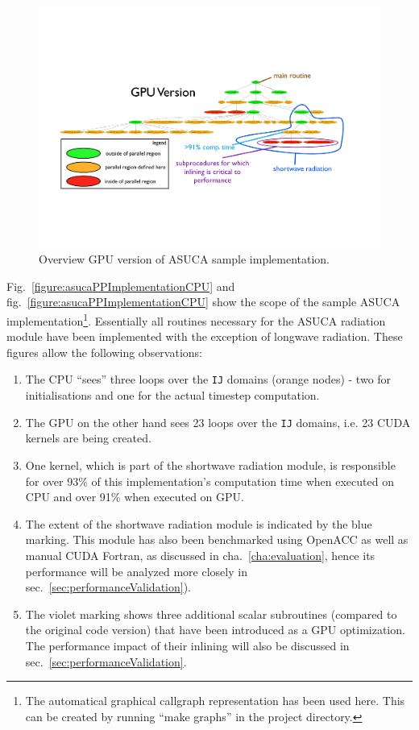 \begin{figure}[htpb]
        \centering
        \includegraphics[width=14cm]{figures/asucaPPImplementationGPU}
        \caption[GPU Version of Sample Hybrid Fortran Implementation]{Overview GPU version of ASUCA sample implementation.}
        \label{figure:asucaPPImplementationGPU}
\end{figure}

Fig.~\ref{figure:asucaPPImplementationCPU} and fig.~\ref{figure:asucaPPImplementationCPU} show the scope of the sample ASUCA implementation\footnote{The automatical graphical callgraph representation has been used here. This can be created by running ``make graphs'' in the project directory.}. Essentially all routines necessary for the ASUCA radiation module have been implemented with the exception of longwave radiation. These figures allow the following observations: 

\begin{enumerate}
 \item The CPU ``sees'' three loops over the \verb|IJ| domains (orange nodes) - two for initialisations and one for the actual timestep computation.
 \item The GPU on the other hand sees 23 loops over the \verb|IJ| domains, i.e. 23 CUDA kernels are being created.
 \item One kernel, which is part of the shortwave radiation module, is responsible for over 93\% of this implementation's computation time when executed on CPU and over 91\% when executed on GPU.
 \item The extent of the shortwave radiation module is indicated by the blue marking. This module has also been benchmarked using OpenACC as well as manual CUDA Fortran, as discussed in cha.~\ref{cha:evaluation}, hence its performance will be analyzed more closely in sec.~\ref{sec:performanceValidation}).
 \item The violet marking shows three additional scalar subroutines (compared to the original code version) that have been introduced as a GPU optimization. The performance impact of their inlining will also be discussed in sec.~\ref{sec:performanceValidation}. 
\end{enumerate}


